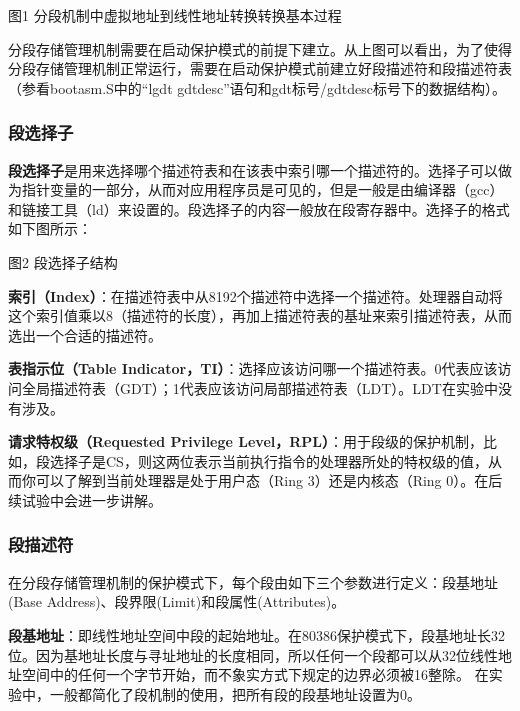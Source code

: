 图1 分段机制中虚拟地址到线性地址转换转换基本过程

分段存储管理机制需要在启动保护模式的前提下建立。从上图可以看出，为了使得分段存储管理机制正常运行，需要在启动保护模式前建立好段描述符和段描述符表（参看bootasm.S中的``lgdt
gdtdesc''语句和gdt标号/gdtdesc标号下的数据结构）。

\subsubsection{段选择子}\label{ux6bb5ux9009ux62e9ux5b50}

\textbf{段选择子}是用来选择哪个描述符表和在该表中索引哪一个描述符的。选择子可以做为指针变量的一部分，从而对应用程序员是可见的，但是一般是由编译器（gcc）和链接工具（ld）来设置的。段选择子的内容一般放在段寄存器中。选择子的格式如下图所示：


图2 段选择子结构

\textbf{索引（Index）}：在描述符表中从8192个描述符中选择一个描述符。处理器自动将这个索引值乘以8（描述符的长度），再加上描述符表的基址来索引描述符表，从而选出一个合适的描述符。

\textbf{表指示位（Table
Indicator，TI）}：选择应该访问哪一个描述符表。0代表应该访问全局描述符表（GDT）；1代表应该访问局部描述符表（LDT）。LDT在实验中没有涉及。

\textbf{请求特权级（Requested Privilege
Level，RPL）}：用于段级的保护机制，比如，段选择子是CS，则这两位表示当前执行指令的处理器所处的特权级的值，从而你可以了解到当前处理器是处于用户态（Ring
3）还是内核态（Ring 0）。在后续试验中会进一步讲解。

\subsubsection{段描述符}\label{ux6bb5ux63cfux8ff0ux7b26}

在分段存储管理机制的保护模式下，每个段由如下三个参数进行定义：段基地址(Base
Address)、段界限(Limit)和段属性(Attributes)。

\textbf{段基地址}：即线性地址空间中段的起始地址。在80386保护模式下，段基地址长32位。因为基地址长度与寻址地址的长度相同，所以任何一个段都可以从32位线性地址空间中的任何一个字节开始，而不象实方式下规定的边界必须被16整除。
在实验中，一般都简化了段机制的使用，把所有段的段基地址设置为0。

